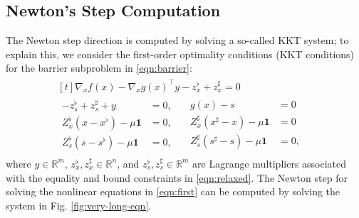 \subsection{Newton's Step Computation}
The Newton step direction is computed by solving a so-called KKT system; to explain this, we consider the first-order optimality conditions (KKT conditions) for the barrier subproblem in \eqref{eqn:barrier}:
\begin{align}\label{eqn:first}
  \begin{aligned}[t]
    \nabla_{x} f(x) - \nabla_{x}g(x)^\top y  - z_x^\flat  + z_x^\sharp = 0\;&\\
    \begin{aligned}
      - z_s^\flat  + z_s^\sharp + y &= 0,\\
      Z^\flat_x (x-x^\flat) - \mu\boldsymbol{1} &= 0,\\
      Z^\flat_s (s-s^\flat) - \mu\boldsymbol{1}&= 0,
    \end{aligned}
    \quad
    \begin{aligned}
      g(x) - s  &= 0\\
      Z^\sharp_x (x^\sharp-x) - \mu\boldsymbol{1}&= 0\\
      Z^\sharp_s (s^\sharp-s) - \mu\boldsymbol{1}&= 0,
    \end{aligned}&
  \end{aligned}
\end{align}
where $y\in\mathbb{R}^{m}$, $z_x^\flat,z_x^\sharp\in\mathbb{R}^{n}$,
and $z_s^\flat,z_s^\sharp\in\mathbb{R}^{m}$ are Lagrange multipliers
associated with the equality and bound constraints in
\eqref{eqn:relaxed}. The Newton step for solving the nonlinear
equations in \eqref{eqn:first} can be computed by solving the system in Fig. \ref{fig:very-long-eqn}.
